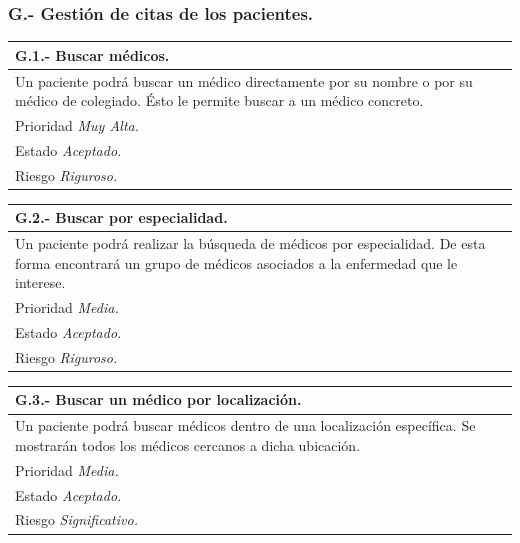 \documentclass[a4paper,oneside,11pt]{book}
\begin{document}
\subsubsection{G.- Gestión de citas de los pacientes.}

\begin{center}
\begin{tabulary}{15cm}{|L|}
	\hline
		\bf{G.1.- Buscar médicos.} \\
	\hline
		Un paciente podrá buscar un médico directamente por su nombre o por su médico de colegiado. Ésto le permite buscar a un médico concreto. \\
	\hline
		Prioridad \textit{Muy Alta.} \\
	\hline
		Estado \textit{Aceptado.} \\
	\hline
		Riesgo \textit{Riguroso.} \\
	\hline
\end{tabulary}
\end{center}

\begin{center}
\begin{tabulary}{15cm}{|L|}
	\hline
		\bf{G.2.- Buscar por especialidad.} \\
	\hline
		Un paciente podrá realizar la búsqueda de médicos por especialidad. De esta forma encontrará un grupo de médicos asociados a la enfermedad que le interese. \\
	\hline
		Prioridad \textit{Media.} \\
	\hline
		Estado \textit{Aceptado.} \\
	\hline
		Riesgo \textit{Riguroso.} \\
	\hline
\end{tabulary}
\end{center}

\begin{center}
\begin{tabulary}{15cm}{|L|}
	\hline
		\bf{G.3.- Buscar un médico por localización.} \\
	\hline
		Un paciente podrá buscar médicos dentro de una localización específica. Se mostrarán todos los médicos cercanos a dicha ubicación. \\
	\hline
		Prioridad \textit{Media.} \\
	\hline
		Estado \textit{Aceptado.} \\
	\hline
		Riesgo \textit{Significativo.} \\
	\hline
\end{tabulary}
\end{center}
\end{document}
